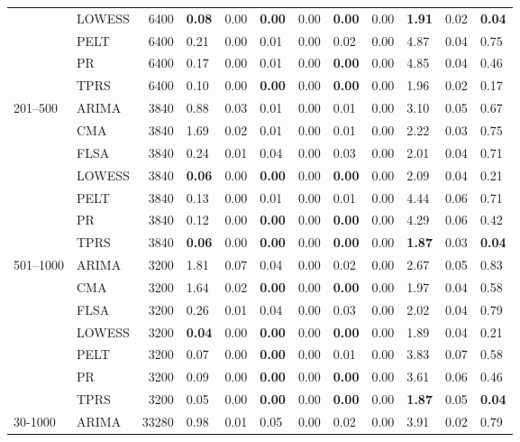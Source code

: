 \begin{table}[ht]
\begin{tabular}{llrlrlrlrlrl}
   & LOWESS & 6400 & \textbf{0.08} & 0.00 & \textbf{0.00} & 0.00 & \textbf{0.00} & 0.00 & \textbf{1.91} & 0.02 & \textbf{0.04} \\ 
   & PELT & 6400 & 0.21 & 0.00 & 0.01 & 0.00 & 0.02 & 0.00 & 4.87 & 0.04 & 0.75 \\ 
   & PR & 6400 & 0.17 & 0.00 & 0.01 & 0.00 & \textbf{0.00} & 0.00 & 4.85 & 0.04 & 0.46 \\ 
   & TPRS & 6400 & 0.10 & 0.00 & \textbf{0.00} & 0.00 & \textbf{0.00} & 0.00 & 1.96 & 0.02 & 0.17 \\ 
  201–500 & ARIMA & 3840 & 0.88 & 0.03 & 0.01 & 0.00 & 0.01 & 0.00 & 3.10 & 0.05 & 0.67 \\ 
   & CMA & 3840 & 1.69 & 0.02 & 0.01 & 0.00 & 0.01 & 0.00 & 2.22 & 0.03 & 0.75 \\ 
   & FLSA & 3840 & 0.24 & 0.01 & 0.04 & 0.00 & 0.03 & 0.00 & 2.01 & 0.04 & 0.71 \\ 
   & LOWESS & 3840 & \textbf{0.06} & 0.00 & \textbf{0.00} & 0.00 & \textbf{0.00} & 0.00 & 2.09 & 0.04 & 0.21 \\ 
   & PELT & 3840 & 0.13 & 0.00 & 0.01 & 0.00 & 0.01 & 0.00 & 4.44 & 0.06 & 0.71 \\ 
   & PR & 3840 & 0.12 & 0.00 & \textbf{0.00} & 0.00 & \textbf{0.00} & 0.00 & 4.29 & 0.06 & 0.42 \\ 
   & TPRS & 3840 & \textbf{0.06} & 0.00 & \textbf{0.00} & 0.00 & \textbf{0.00} & 0.00 & \textbf{1.87} & 0.03 & \textbf{0.04} \\ 
  501–1000 & ARIMA & 3200 & 1.81 & 0.07 & 0.04 & 0.00 & 0.02 & 0.00 & 2.67 & 0.05 & 0.83 \\ 
   & CMA & 3200 & 1.64 & 0.02 & \textbf{0.00} & 0.00 & \textbf{0.00} & 0.00 & 1.97 & 0.04 & 0.58 \\ 
   & FLSA & 3200 & 0.26 & 0.01 & 0.04 & 0.00 & 0.03 & 0.00 & 2.02 & 0.04 & 0.79 \\ 
   & LOWESS & 3200 & \textbf{0.04} & 0.00 & \textbf{0.00} & 0.00 & \textbf{0.00} & 0.00 & 1.89 & 0.04 & 0.21 \\ 
   & PELT & 3200 & 0.07 & 0.00 & \textbf{0.00} & 0.00 & 0.01 & 0.00 & 3.83 & 0.07 & 0.58 \\ 
   & PR & 3200 & 0.09 & 0.00 & \textbf{0.00} & 0.00 & \textbf{0.00} & 0.00 & 3.61 & 0.06 & 0.46 \\ 
   & TPRS & 3200 & 0.05 & 0.00 & \textbf{0.00} & 0.00 & \textbf{0.00} & 0.00 & \textbf{1.87} & 0.05 & \textbf{0.04} \\ 
  30-1000 & ARIMA & 33280 & 0.98 & 0.01 & 0.05 & 0.00 & 0.02 & 0.00 & 3.91 & 0.02 & 0.79 \\ 

\end{tabular}
\end{table}
